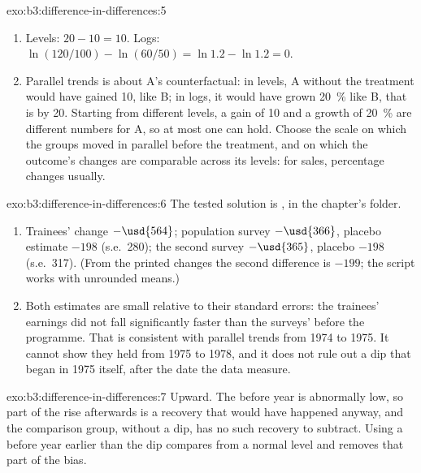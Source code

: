 \begin{solution}{exo:b3:difference-in-differences:5}
\begin{enumerate}
\item Levels: $20 - 10 = 10$. Logs: $\ln(120/100) - \ln(60/50) = \ln 1.2 -
\ln 1.2 = 0$.
\item Parallel trends is about A's counterfactual: in levels, A without the
treatment would have gained 10, like B; in logs, it would have grown 20~\% like B,
that is by 20. Starting from different levels, a gain of 10 and a growth of 20~\%
are different numbers for A, so at most one can hold. Choose the scale on which the groups moved in
parallel before the treatment, and on which the outcome's changes are
comparable across its levels: for sales, percentage changes usually.
\end{enumerate}
\end{solution}

\begin{solution}{exo:b3:difference-in-differences:6}
The tested solution is , in the chapter's
 folder.
\begin{enumerate}
\item Trainees' change $-\usd{564}$; population survey $-\usd{366}$,
placebo estimate $-198$ (s.e.\ 280); the second survey $-\usd{365}$, placebo
$-198$ (s.e.\ 317). %
(From the printed changes the second difference is $-199$; the script works with
unrounded means.)
\item Both estimates are small relative to their standard errors: the
trainees' earnings did not fall significantly faster than the surveys' before the
programme. That is consistent with parallel trends from 1974 to 1975. It cannot
show they held from 1975 to 1978, and it does not rule out a dip that began
in 1975 itself, after the date the data measure.
\end{enumerate}
\end{solution}

\begin{solution}{exo:b3:difference-in-differences:7}
Upward. The before year is abnormally low, so part of the rise afterwards is a
recovery that would have happened anyway, and the comparison group, without a
dip, has no such recovery to subtract. Using a before year earlier than the dip
compares from a normal level and removes that part of the bias.
\end{solution}

